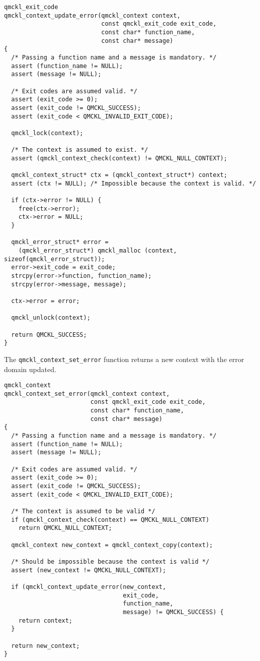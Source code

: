 \begin{verbatim}
qmckl_exit_code
qmckl_context_update_error(qmckl_context context,
                           const qmckl_exit_code exit_code,
                           const char* function_name,
                           const char* message)
{
  /* Passing a function name and a message is mandatory. */
  assert (function_name != NULL);
  assert (message != NULL);

  /* Exit codes are assumed valid. */
  assert (exit_code >= 0);
  assert (exit_code != QMCKL_SUCCESS);
  assert (exit_code < QMCKL_INVALID_EXIT_CODE);

  qmckl_lock(context);
  
  /* The context is assumed to exist. */
  assert (qmckl_context_check(context) != QMCKL_NULL_CONTEXT);

  qmckl_context_struct* ctx = (qmckl_context_struct*) context;
  assert (ctx != NULL); /* Impossible because the context is valid. */

  if (ctx->error != NULL) {
    free(ctx->error);
    ctx->error = NULL;
  }

  qmckl_error_struct* error =
    (qmckl_error_struct*) qmckl_malloc (context, sizeof(qmckl_error_struct));
  error->exit_code = exit_code;
  strcpy(error->function, function_name);
  strcpy(error->message, message);

  ctx->error = error;

  qmckl_unlock(context);
  
  return QMCKL_SUCCESS;
}
\end{verbatim}

The \texttt{qmckl\_context\_set\_error} function returns a new context with
the error domain updated.

\begin{verbatim}
qmckl_context
qmckl_context_set_error(qmckl_context context,
                        const qmckl_exit_code exit_code,
                        const char* function_name,
                        const char* message)
{
  /* Passing a function name and a message is mandatory. */
  assert (function_name != NULL);
  assert (message != NULL);

  /* Exit codes are assumed valid. */
  assert (exit_code >= 0);
  assert (exit_code != QMCKL_SUCCESS);
  assert (exit_code < QMCKL_INVALID_EXIT_CODE);

  /* The context is assumed to be valid */
  if (qmckl_context_check(context) == QMCKL_NULL_CONTEXT)
    return QMCKL_NULL_CONTEXT;

  qmckl_context new_context = qmckl_context_copy(context);

  /* Should be impossible because the context is valid */
  assert (new_context != QMCKL_NULL_CONTEXT);

  if (qmckl_context_update_error(new_context,
                                 exit_code,
                                 function_name,
                                 message) != QMCKL_SUCCESS) {
    return context;
  }

  return new_context;
}
\end{verbatim}


